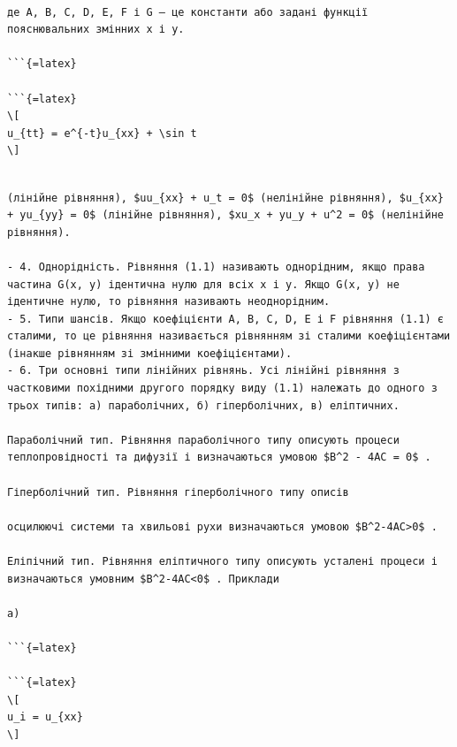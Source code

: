 \documentclass[
]{article}
\begin{document}
\begin{verbatim}

де A, B, C, D, E, F і G — це константи або задані функції пояснювальних змінних x і y.

```{=latex}

```{=latex}
\[
u_{tt} = e^{-t}u_{xx} + \sin t
\]
\end{verbatim}

\begin{verbatim}

(лінійне рівняння), $uu_{xx} + u_t = 0$ (нелінійне рівняння), $u_{xx} + yu_{yy} = 0$ (лінійне рівняння), $xu_x + yu_y + u^2 = 0$ (нелінійне рівняння).

- 4. Однорідність. Рівняння (1.1) називають однорідним, якщо права частина G(x, y) ідентична нулю для всіх x і y. Якщо G(x, y) не ідентичне нулю, то рівняння називають неоднорідним.
- 5. Типи шансів. Якщо коефіцієнти A, B, C, D, E і F рівняння (1.1) є сталими, то це рівняння називається рівнянням зі сталими коефіцієнтами (інакше рівнянням зі змінними коефіцієнтами).
- 6. Три основні типи лінійних рівнянь. Усі лінійні рівняння з частковими похідними другого порядку виду (1.1) належать до одного з трьох типів: а) параболічних, б) гіперболічних, в) еліптичних.

Параболічний тип. Рівняння параболічного типу описують процеси теплопровідності та дифузії і визначаються умовою $B^2 - 4AC = 0$ .

Гіперболічний тип. Рівняння гіперболічного типу описів

осцилюючі системи та хвильові рухи визначаються умовою $B^2-4AC>0$ .

Еліпічний тип. Рівняння еліптичного типу описують усталені процеси і визначаються умовним $B^2-4AC<0$ . Приклади

a)

```{=latex}

```{=latex}
\[
u_i = u_{xx}
\]
\end{verbatim}
\end{document}
